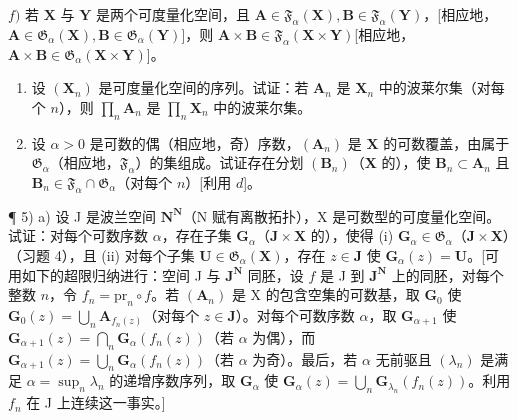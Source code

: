 \(f)\) 若 \(\mathbf{X}\) 与 \(\mathbf{Y}\) 是两个可度量化空间，且 \(\mathbf{A} \in \mathfrak{F}_{\alpha}(\mathbf{X}), \mathbf{B} \in \mathfrak{F}_{\alpha}(\mathbf{Y})\)，{[}相应地，\(\mathbf{A} \in \mathfrak{G}_{\alpha}(\mathbf{X}), \mathbf{B} \in \mathfrak{G}_{\alpha}(\mathbf{Y})\){]}，则 \(\mathbf{A} \times \mathbf{B} \in \mathfrak{F}_{\alpha}(\mathbf{X} \times \mathbf{Y})\){[}相应地，\(\mathbf{A} \times \mathbf{B} \in \mathfrak{G}_{\alpha}(\mathbf{X} \times \mathbf{Y})\){]}。

\begin{enumerate}
\def\labelenumi{\alph{enumi})}
\setcounter{enumi}{6}
\item
  设 \((\mathbf{X}_n)\) 是可度量化空间的序列。试证：若 \(\mathbf{A}_n\) 是 \(\mathbf{X}_n\) 中的波莱尔集（对每个 \(n\)），则 \(\prod_{n} \mathbf{A}_n\) 是 \(\prod_{n} \mathbf{X}_n\) 中的波莱尔集。
\item
  设 \(\alpha > 0\) 是可数的偶（相应地，奇）序数，\((\mathbf{A}_n)\) 是 \(\mathbf{X}\) 的可数覆盖，由属于 \(\mathfrak{G}_{\alpha}\)（相应地，\(\mathfrak{F}_{\alpha}\)）的集组成。试证存在分划 \((\mathbf{B}_n)\)（\(\mathbf{X}\) 的），使 \(\mathbf{B}_n \subset \mathbf{A}_n\) 且 \(\mathbf{B}_n \in \mathfrak{F}_{\alpha} \cap \mathfrak{G}_{\alpha}\)（对每个 \(n\)）{[}利用 \(d\){]}。
\end{enumerate}

¶ 5) a) 设 J 是波兰空间 \(\mathbf{N}^{\mathbf{N}}\)（N 赋有离散拓扑），X 是可数型的可度量化空间。试证：对每个可数序数 \(\alpha\)，存在子集 \(\mathbf{G}_{\alpha}\)（\(\mathbf{J} \times \mathbf{X}\) 的），使得 (i) \(\mathbf{G}_{\alpha} \in \mathfrak{G}_{\alpha}\)（\(\mathbf{J} \times \mathbf{X}\)）（习题 4），且 (ii) 对每个子集 \(\mathbf{U} \in \mathfrak{G}_{\alpha}(\mathbf{X})\)，存在 \(z \in \mathbf{J}\) 使 \(\mathbf{G}_{\alpha}(z) = \mathbf{U}\)。{[}可用如下的超限归纳进行：空间 J 与 \(\mathbf{J}^{\mathbf{N}}\) 同胚，设 \(f\) 是 J 到 \(\mathbf{J}^{\mathbf{N}}\) 上的同胚，对每个整数 \(n\)，令 \(f_{n} = \mathrm{pr}_{n} \circ f\)。若 \((\mathbf{A}_{n})\) 是 X 的包含空集的可数基，取 \(\mathbf{G}_{0}\) 使 \(\mathbf{G}_{0}(z) = \bigcup_{n} \mathbf{A}_{f_{n}(z)}\)（对每个 \(z \in \mathbf{J}\)）。对每个可数序数 \(\alpha\)，取 \(\mathbf{G}_{\alpha+1}\) 使 \(\mathbf{G}_{\alpha+1}(z) = \bigcap_{n} \mathbf{G}_{\alpha}(f_{n}(z))\)（若 \(\alpha\) 为偶），而 \(\mathbf{G}_{\alpha+1}(z) = \bigcup_{n} \mathbf{G}_{\alpha}(f_{n}(z))\)（若 \(\alpha\) 为奇）。最后，若 \(\alpha\) 无前驱且 \((\lambda_{n})\) 是满足 \(\alpha = \sup_{n} \lambda_{n}\) 的递增序数序列，取 \(\mathbf{G}_{\alpha}\) 使 \(\mathbf{G}_{\alpha}(z) = \bigcup_{n} \mathbf{G}_{\lambda_{n}}(f_{n}(z))\)。利用 \(f_{n}\) 在 J 上连续这一事实。{]}

